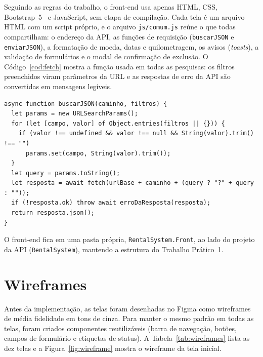\documentclass[12pt]{article}
\begin{document}
Seguindo as regras do trabalho, o front-end usa apenas HTML, CSS, Bootstrap~5~\cite{bootstrap} e
JavaScript, sem etapa de compilação. Cada tela é um arquivo HTML com um script próprio, e o arquivo
\texttt{js/comum.js} reúne o que todas compartilham: o endereço da API, as funções de requisição
(\texttt{buscarJSON} e \texttt{enviarJSON}), a formatação de moeda, datas e quilometragem, os avisos
(\emph{toasts}), a validação de formulários e o modal de confirmação de exclusão.
O Código~\ref{cod:fetch} mostra a função usada em todas as pesquisas: os filtros preenchidos viram
parâmetros da URL e as respostas de erro da API são convertidas em mensagens legíveis.

\begin{lstlisting}[language=JS, caption={Função de pesquisa compartilhada (\texttt{comum.js}).}, label={cod:fetch}]
async function buscarJSON(caminho, filtros) {
  let params = new URLSearchParams();
  for (let [campo, valor] of Object.entries(filtros || {})) {
    if (valor !== undefined && valor !== null && String(valor).trim() !== "")
      params.set(campo, String(valor).trim());
  }
  let query = params.toString();
  let resposta = await fetch(urlBase + caminho + (query ? "?" + query : ""));
  if (!resposta.ok) throw await erroDaResposta(resposta);
  return resposta.json();
}
\end{lstlisting}

O front-end fica em uma pasta própria, \texttt{RentalSystem.Front}, ao lado do projeto da API
(\texttt{RentalSystem}), mantendo a estrutura do Trabalho Prático~1.

\section{Wireframes}
\label{sec:wireframes}

Antes da implementação, as telas foram desenhadas no Figma como wireframes de média fidelidade em
tons de cinza. Para manter o mesmo padrão em todas as telas, foram criados componentes reutilizáveis
(barra de navegação, botões, campos de formulário e etiquetas de status). A Tabela~\ref{tab:wireframes}
lista as dez telas e a Figura~\ref{fig:wireframe} mostra o wireframe da tela inicial.
\end{document}
